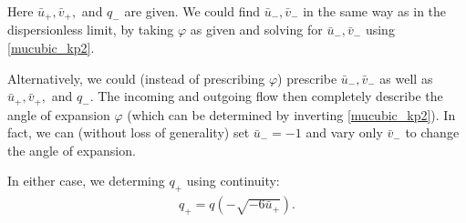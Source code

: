 \documentclass[12pt]{article}
\numberwithin{equation}{section}
\begin{document}
Here $\bar u_+, \bar v_+,$ and $q_-$ are given. We could find $\bar u_-, \bar v_-$ in the same way as in the dispersionless limit, by taking $\varphi$ as given and solving for $\bar u_-, \bar v_-$ using \eqref{mucubic_kp2}.

Alternatively, we could (instead of prescribing $\varphi$) prescribe $\bar u_-, \bar v_-$ as well as $\bar u_+, \bar v_+,$ and $q_-$. The incoming and outgoing flow then completely describe the angle of expansion $\varphi$ (which can be determined by inverting \eqref{mucubic_kp2}). In fact, we can (without loss of generality) set $\bar u_- = -1$ and vary only $\bar v_-$ to change the angle of expansion.

In either case, we determing $q_+$ using continuity:
\begin{align}
    q_+ = q(-\sqrt{-6\bar u_+}).
\end{align}
\end{document}
